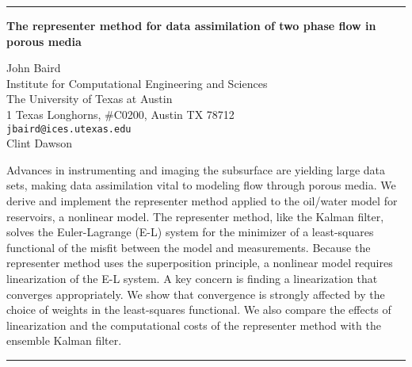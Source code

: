 \documentclass[twosided]{report}
\begin{document}
	\begin{center} \rule{6in}{1pt} \end{center}

\begin{center}
{\large			%
{\bf The representer method for data assimilation
of two phase flow in porous media}}

	John Baird \\
	Institute for Computational Engineering and Sciences \\
	The University of Texas at Austin \\
	1 Texas Longhorns, \#C0200, \quad  Austin TX 78712 \\
	{\tt jbaird@ices.utexas.edu} \\
	Clint Dawson
\end{center}
Advances in instrumenting and imaging the subsurface are
yielding large data sets, making data assimilation vital to
modeling flow through porous media. We derive and implement
the representer method applied to the oil/water model for
reservoirs, a nonlinear model. The representer method, like
the Kalman filter, solves the Euler-Lagrange (E-L) system
for the minimizer of a least-squares functional of the
misfit between the model and measurements. Because the
representer method uses the superposition principle, a
nonlinear model requires linearization of the E-L system. A
key concern is finding a linearization that converges
appropriately. We show that convergence is strongly affected
by the choice of weights in the least-squares functional. We
also compare the effects of linearization and the
computational costs of the representer method with the
ensemble Kalman filter.



	\begin{center} \rule{6in}{1pt} \end{center}

\newpage
\end{document}

